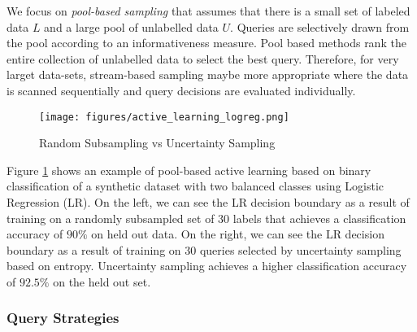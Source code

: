 We focus on \textit{pool-based sampling} that assumes that there is a small set of labeled data $L$ and a large pool of unlabelled data $U$. Queries are selectively drawn from the pool according to an informativeness measure. Pool based methods rank the entire collection of unlabelled data to select the best query. Therefore, for very larget data-sets, stream-based sampling maybe more appropriate where the data is scanned sequentially and query decisions are evaluated individually.\\

\begin{figure}[tbhp]
    \centering
    \texttt{[image: figures/active\_learning\_logreg.png]}
    \caption{Random Subsampling vs Uncertainty Sampling}
    \label{fig:al_logreg}
\end{figure}

Figure \ref{fig:al_logreg} shows an example of pool-based active learning based on binary classification of a synthetic dataset with two balanced classes using Logistic Regression (LR). On the left, we can see the LR decision boundary as a result of training on a randomly subsampled set of $30$ labels that achieves a classification accuracy of $90\%$ on held out data. On the right, we can see the LR decision boundary as a result of training on $30$ queries selected by uncertainty sampling based on entropy. Uncertainty sampling achieves a higher classification accuracy of $92.5\%$ on the held out set.   


\subsubsection{Query Strategies}

